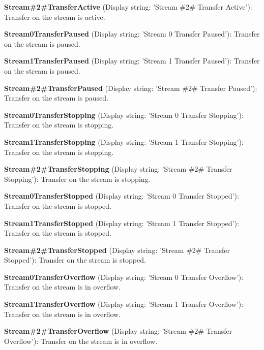 \begin{DoxyItemize}
\item {\bfseries Stream\#2\#Transfer\+Active} (Display string\+: 'Stream \#2\# Transfer Active')\+: Transfer on the stream is active.
\item {\bfseries Stream0\+Transfer\+Paused} (Display string\+: 'Stream 0 Transfer Paused')\+: Transfer on the stream is paused.
\item {\bfseries Stream1\+Transfer\+Paused} (Display string\+: 'Stream 1 Transfer Paused')\+: Transfer on the stream is paused.
\item {\bfseries Stream\#2\#Transfer\+Paused} (Display string\+: 'Stream \#2\# Transfer Paused')\+: Transfer on the stream is paused.
\item {\bfseries Stream0\+Transfer\+Stopping} (Display string\+: 'Stream 0 Transfer Stopping')\+: Transfer on the stream is stopping.
\item {\bfseries Stream1\+Transfer\+Stopping} (Display string\+: 'Stream 1 Transfer Stopping')\+: Transfer on the stream is stopping.
\item {\bfseries Stream\#2\#Transfer\+Stopping} (Display string\+: 'Stream \#2\# Transfer Stopping')\+: Transfer on the stream is stopping.
\item {\bfseries Stream0\+Transfer\+Stopped} (Display string\+: 'Stream 0 Transfer Stopped')\+: Transfer on the stream is stopped.
\item {\bfseries Stream1\+Transfer\+Stopped} (Display string\+: 'Stream 1 Transfer Stopped')\+: Transfer on the stream is stopped.
\item {\bfseries Stream\#2\#Transfer\+Stopped} (Display string\+: 'Stream \#2\# Transfer Stopped')\+: Transfer on the stream is stopped.
\item {\bfseries Stream0\+Transfer\+Overflow} (Display string\+: 'Stream 0 Transfer Overflow')\+: Transfer on the stream is in overflow.
\item {\bfseries Stream1\+Transfer\+Overflow} (Display string\+: 'Stream 1 Transfer Overflow')\+: Transfer on the stream is in overflow.
\item {\bfseries Stream\#2\#Transfer\+Overflow} (Display string\+: 'Stream \#2\# Transfer Overflow')\+: Transfer on the stream is in overflow.
\end{DoxyItemize}

